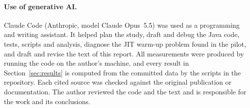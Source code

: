 \documentclass[11pt,a4paper]{article}
\begin{document}
\paragraph{Use of generative AI.} Claude Code (Anthropic, model Claude Opus~5.5)
was used as a programming and writing assistant. It helped plan the study, draft
and debug the Java code, tests, scripts and analysis, diagnose the JIT warm-up
problem found in the pilot, and draft and revise the text of this report. All
measurements were produced by running the code on the author's machine, and
every result in Section~\ref{sec:results} is computed from the committed data by
the scripts in the repository. Each cited source was checked against the
original publication or documentation. The author reviewed the code and the
text and is responsible for the work and its conclusions.
\end{document}
